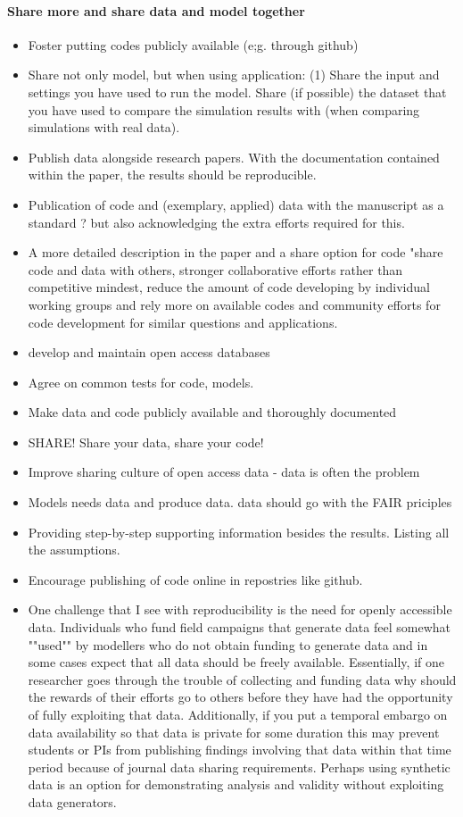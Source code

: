 \documentclass{article}
\begin{document}
\paragraph{Share more and share data and model together}
\begin{itemize}
	\item Foster putting codes publicly available (e;g. through github)
	\item Share not only model, but when using application: (1) Share the input and settings you have used to run the model. Share (if possible) the dataset that you have used to compare the simulation results with (when comparing simulations with real data).
	\item Publish data alongside research papers. With the documentation contained within the paper, the results should be reproducible.
	\item Publication of code and (exemplary, applied) data with the manuscript as a standard ? but also acknowledging the extra efforts required for this.
	\item A more detailed description in the paper and a share option for code "share code and data with others, stronger collaborative efforts rather than competitive mindest, reduce the amount of code developing by individual working groups and rely more on available codes and community efforts for code development for similar questions and applications.
	\item develop and maintain open access databases
	\item Agree on common tests for code, models.
	\item Make data and code publicly available and thoroughly documented
	\item SHARE! Share your data, share your code!
	\item Improve sharing culture of open access data - data is often the problem
	\item Models needs data and produce data. data should go with the FAIR priciples
	\item Providing step-by-step supporting information besides the results. Listing all the assumptions.
	\item Encourage publishing of code online in repostries like github.
	\item One challenge that I see with reproducibility is the need for openly accessible data. Individuals who fund field campaigns that generate data feel somewhat ""used"" by modellers who do not obtain funding to generate data and in some cases expect that all data should be freely available. Essentially, if one researcher goes through the trouble of collecting and funding data why should the rewards of their efforts go to others before they have had the opportunity of fully exploiting that data. Additionally, if you put a temporal embargo on data availability so that data is private for some duration this may prevent students or PIs from publishing findings involving that data within that time period because of journal data sharing requirements. Perhaps using synthetic data is an option for demonstrating analysis and validity without exploiting data generators.

\end{itemize}
\end{document}
